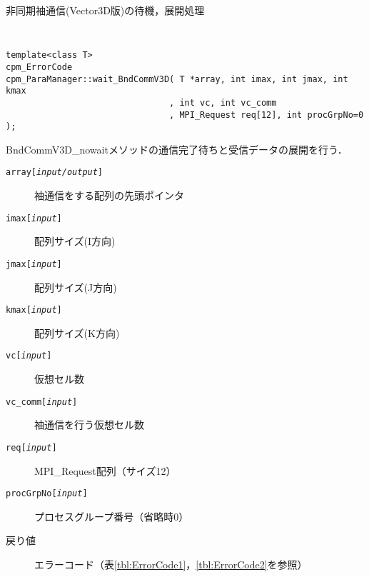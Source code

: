 \begin{spacing}{0.8}
\begin{itembox}[l]{非同期袖通信(Vector3D版)の待機，展開処理}
{\tt
\begin{verbatim}
template<class T>
cpm_ErrorCode
cpm_ParaManager::wait_BndCommV3D( T *array, int imax, int jmax, int kmax
                                , int vc, int vc_comm
                                , MPI_Request req[12], int procGrpNo=0 );
\end{verbatim}
}
BndCommV3D\_nowaitメソッドの通信完了待ちと受信データの展開を行う．
\begin{description}
\item[{\tt array[{\it input/output}]}] 袖通信をする配列の先頭ポインタ
\item[{\tt imax[{\it input}]}] 配列サイズ(I方向)
\item[{\tt jmax[{\it input}]}] 配列サイズ(J方向)
\item[{\tt kmax[{\it input}]}] 配列サイズ(K方向)
\item[{\tt vc[{\it input}]}] 仮想セル数
\item[{\tt vc\_comm[{\it input}]}] 袖通信を行う仮想セル数
\item[{\tt req[{\it input}]}] MPI\_Request配列（サイズ12）
\item[{\tt procGrpNo[{\it input}]}] プロセスグループ番号（省略時0）
\\
\item[戻り値] エラーコード（表\ref{tbl:ErrorCode1}，\ref{tbl:ErrorCode2}を参照）
\end{description}
\end{itembox}\\
\end{spacing}

